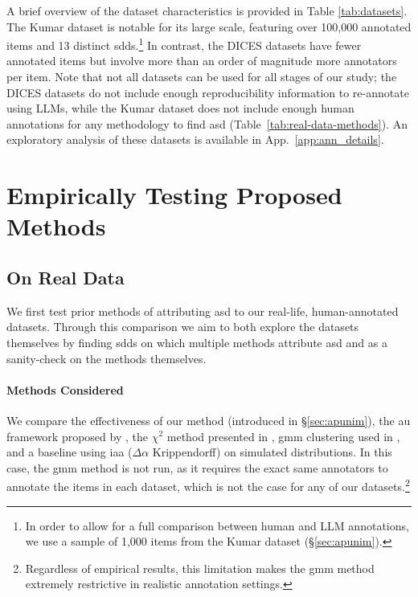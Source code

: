 \documentclass[manuscript,screen,review,anonymous]{acmart}
\theoremstyle{acmplain}
\theoremstyle{researchquestionstyle}
\begin{document}
A brief overview of the dataset characteristics is provided in Table \ref{tab:datasets}. The Kumar dataset is notable for its large scale, featuring over 100,000 annotated items and 13 distinct \acp{sdd}.\footnote{In order to allow for a full comparison between human and LLM annotations, we use a sample of 1{,}000 items from the Kumar dataset (\S\ref{sec:apunim}).} In contrast, the DICES datasets have fewer annotated items but involve more than an order of magnitude more annotators per item.  Note that not all datasets can be used for all stages of our study; the DICES datasets do not include enough reproducibility information to re-annotate using LLMs, while the Kumar dataset does not include enough human annotations for any methodology to find \ac{asd} (Table~\ref{tab:real-data-methods}). An exploratory analysis of these datasets is available in App.~\ref{app:ann_details}.


\section{Empirically Testing Proposed Methods}
\label{sec:methods}

\subsection{On Real Data}




We first test prior methods of attributing \ac{asd} to our real-life, human-annotated datasets. Through this comparison we aim to both explore the datasets themselves by finding \acp{sdd} on which multiple methods attribute \ac{asd} and as a sanity-check on the methods themselves.

\paragraph{Methods Considered} We compare the effectiveness of our method (introduced in \S\ref{sec:apunim}), the \ac{au} framework proposed by \citet{pavlopoulos-likas-2024}, the $\chi^2$ method presented in \citet{akhtar_2019}, \ac{gmm} clustering used in \citet{checco_2017}, and a baseline using \ac{iaa} ($\Delta \alpha$ Krippendorff) on simulated distributions. In this case, the \ac{gmm} method is not run, as it requires the exact same annotators to annotate the items in each dataset, which is not the case for any of our datasets.\footnote{Regardless of empirical results, this limitation makes the \ac{gmm} method extremely restrictive in realistic annotation settings.}
\end{document}
